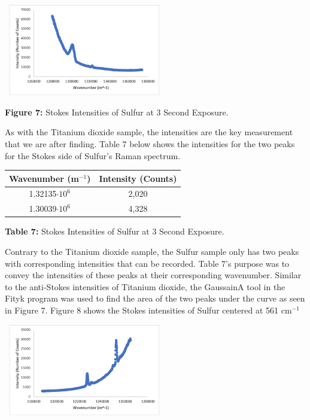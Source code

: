\documentclass[12pt]{article}
\begin{document}
\begin{multicols}{2}
\begin{center}
    \includegraphics[width=7cm, height=4cm]{PHYS 331 RS S Anti-Stokes.png}
    \caption{\textbf{\small{Figure 7:}} \small{Stokes Intensities of Sulfur at 3 Second Exposure.}}
\end{center}
As with the Titanium dioxide sample, the intensities are the key measurement that we are after finding. Table 7 below shows the intensities for the two peaks for the Stokes side of Sulfur's Raman spectrum.
\newline
\begin{tabular}{|c|c|}
    \hline \textbf{Wavenumber (m$^{-1}$)} & \textbf{Intensity (Counts)} \\ \hline
    1.32135$\cdot10^6$ & 2,020 \\ \hline
    1.30039$\cdot10^6$ & 4,328 \\ \hline
\end{tabular}
\centerline{\tiny\textbf{{Table 7:}} \tiny{Stokes Intensities of Sulfur at 3 Second Exposure.}}
\newline
Contrary to the Titanium dioxide sample, the Sulfur sample only has two peaks with corresponding intensities that can be recorded. Table 7's purpose was to convey the intensities of these peaks at their corresponding wavenumber. Similar to the anti-Stokes intensities of Titanium dioxide, the GaussainA tool in the Fityk program was used to find the area of the two peaks under the curve as seen in Figure 7. Figure 8 shows the Stokes intensities of Sulfur centered at 561 cm$^{-1}$
\begin{center}
    \includegraphics[width=7cm, height=4cm]{PHYS 331 RS S Stokes.png}

\end{center}
\end{multicols}
\end{document}
